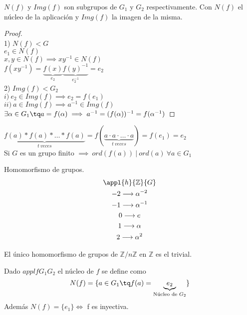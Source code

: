 \documentclass[a4paper,10pt]{apuntes}
\begin{document}
 \begin{theorem}
 $N(f)$ y $Img(f)$ son subgrupos de $G_1$ y $G_2$ respectivamente.
 Con $N(f)$ el núcleo de la aplicación y $Img(f)$ la imagen de la misma.
 \end{theorem}
 \begin{proof}\\
 1) $N(f) < G$\\
 $e_1 \in N(f)$\\ $x, y \in N(f) \implies xy^{-1}\in N(f)$\\
 $f(xy^{-1}) = \underbrace{f(x)}_{e_2} \underbrace{f(y)^{-1}}_{e_2^{-1}} = e_2$\\
 2) $Img(f) < G_2$\\
 $i)\ e_2\in Img(f) \implies e_2 = f(e_1)$\\
 $ii)\ a\in Img(f) \implies a^{-1}\in Img(f)$\\
 $\exists \alpha \in G_1 \tq a=f(\alpha ) \implies a^{-1} = (f(\alpha ))^{-1} = f(\alpha ^{-1})$
 \end{proof}

\obs $\underbrace{f(a) \ast f(a) \ast \hdots \ast f(a)}_{t\ veces} = f(\underbrace{a \cdot a \cdot \hdots \cdot a}_{t\ veces}) = f(e_1) = e_2$\\ Si $G$ es un grupo finito $\implies\ ord(f(a))\ |\ ord(a)\ \forall a \in G_1$

\begin{example} Homomorfismo de grupos.\\
\begin{gather*}
\appl{h}{\mathbb{Z}}{G}\\
-2 \longrightarrow \alpha ^{-2}\\
-1 \longrightarrow \alpha ^{-1}\\
0 \longrightarrow e\\
1 \longrightarrow \alpha\\
2 \longrightarrow \alpha ^{2}\\
\end{gather*}
\end{example}

\obs El único homomorfismo de grupos de $\mathbb{Z}/n\mathbb{Z}$ en $\mathbb{Z}$ es el trivial.\\

\begin{defn}
Dado $appl{f}{G_1}{G_2}$ el núcleo de $f$ se define como\\
$$N(f) = \{ a\in G_1 \tq f(a) = \underbrace{e_2}_{\text{Núcleo de } G_2}\} $$
Además $N(f) = \{ e_1 \} \iff$ f es inyectiva.
\end{defn}
\end{document}
